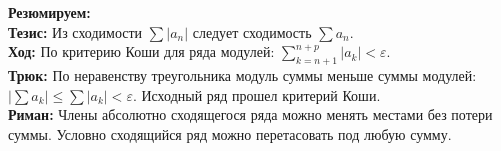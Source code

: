 \begin{tcolorbox}[colback=gray!5, colframe=black, boxrule=0.5pt, arc=0pt]
\textbf{Резюмируем:} \\
\textbf{Тезис:} Из сходимости $\sum |a_n|$ следует сходимость $\sum a_n$. \\
\textbf{Ход:} По критерию Коши для ряда модулей: $\sum_{k=n+1}^{n+p} |a_k| < \varepsilon$. \\
\textbf{Трюк:} По неравенству треугольника модуль суммы меньше суммы модулей: $|\sum a_k| \le \sum |a_k| < \varepsilon$. Исходный ряд прошел критерий Коши. \\
\textbf{Риман:} Члены абсолютно сходящегося ряда можно менять местами без потери суммы. Условно сходящийся ряд можно перетасовать под любую сумму.
\end{tcolorbox}
